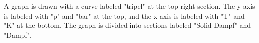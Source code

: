 A graph is drawn with a curve labeled "tripel" at the top right section. The y-axis is labeled with "p" and "bar" at the top, and the x-axis is labeled with "T" and "K" at the bottom. The graph is divided into sections labeled "Solid-Dampf" and "Dampf".